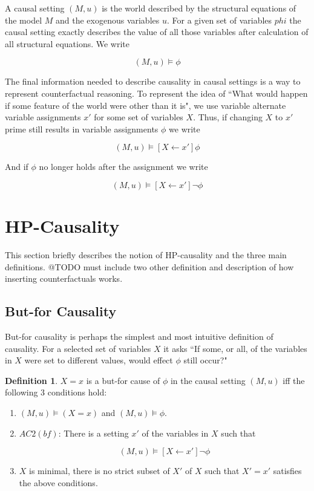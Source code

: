 \documentclass{article}
\theoremstyle{plain}
\theoremstyle{definition}
\newtheorem{defn}[thm]{Definition} %
\begin{document}
A causal setting $(M,u)$ is the world described by the structural equations of the model $M$ and the exogenous variables $u$. For a given set of variables $phi$ the causal setting exactly describes the value of all those variables after calculation of all structural equations. We write

\[
(M,u) \models \phi
\]

The final information needed to describe causality in causal settings is a way to represent counterfactual reasoning. To represent the idea of ``What would happen if some feature of the world were other than it is", we use variable alternate variable assignments $x'$ for some set of variables $X$. Thus, if changing $X$ to $x'$ prime still results in variable assignments $\phi$ we write

\[
(M,u)\models [X\leftarrow x']\phi
\]

And if $\phi$ no longer holds after the assignment we write

\[
(M,u)\models [X\leftarrow x']\lnot \phi
\]

\section{HP-Causality}
This section briefly describes the notion of HP-causality and the three main definitions. @TODO must include two other definition and description of how inserting counterfactuals works.

\subsection{But-for Causality}

But-for causality is perhaps the simplest and most intuitive definition of causality. For a selected set of variables $X$ it asks ``If some, or all, of the variables in $X$ were set to different values, would effect $\phi$ still occur?"

\begin{defn}$X=x$ is a but-for cause of $\phi$ in the causal setting $(M,u)$ iff the following 3 conditions hold:
\begin{enumerate}
\item $(M,u) \models (X=x)$ and $(M,u) \models \phi$.
\item $AC2(bf)$: There is a setting $x'$ of the variables in $X$ such that

\[
(M,u) \models [X\leftarrow x']\lnot \phi
\] 

\item $X$ is minimal, there is no strict subset of $X'$ of $X$ such that $X' = x'$ satisfies the above conditions.
\end{enumerate}

\end{defn}
\end{document}
